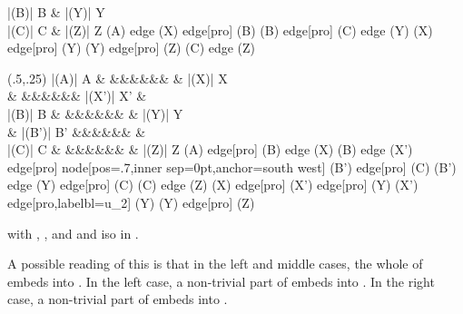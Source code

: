 \documentclass{LMCS}
\theoremstyle{plain}\newtheorem{satz}[thm]{Satz}
\begin{document}
\begin{prop}
\begin{center}
\begin{minipage}[t]{0.25\linewidth}
{        |(B)| B \& |(Y)| Y \\
        |(C)| C \& |(Z)| Z }{(A) edge (X) edge[pro] (B) (B) edge[pro] (C) edge (Y) (X) edge[pro] (Y) (Y) edge[pro] (Z) (C) edge (Z) }
    \end{minipage}
    \hfil
    \begin{minipage}[t]{0.35\linewidth}
      \centering \Diag (.5,.25) {     }{|(A)| A \& \&\&\&\&\&\& \& |(X)| X \\
        \&  \&\&\&\&\&\& |(X')| X' \&  \\
        |(B)| B \& \&\&\&\&\&\& \& |(Y)| Y \\
        \& |(B')| B' \&\&\&\&\&\&  \&  \\
        |(C)| C \& \&\&\&\&\&\& \& |(Z)| Z }{(A) edge[pro] (B) edge (X) (B) edge (X') edge[pro] node[pos=.7,inner sep=0pt,anchor=south west]
        {} (B') edge[pro] (C) (B') edge (Y) edge[pro] (C) (C) edge (Z) (X) edge[pro] (X') edge[pro] (Y) (X') edge[pro,labelbl={u_2}] (Y) (Y) edge[pro] (Z) }
    \end{minipage}
  \end{center}
  with , , and  and
   iso in .
\end{prop}
A possible reading of this is that in the left and middle cases, the
whole of  embeds into . In the left case, a non-trivial part of
 embeds into .  In the right case, a
non-trivial part of  embeds into .
\end{document}
